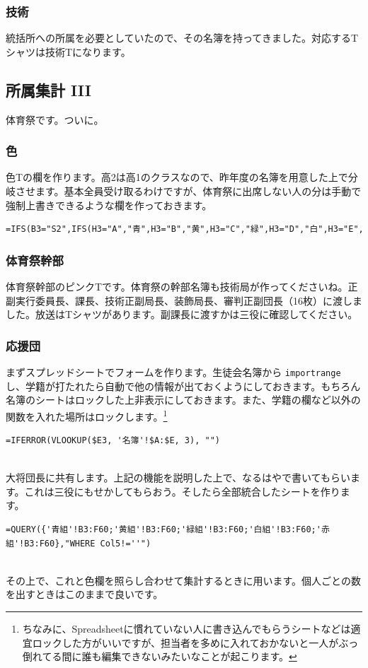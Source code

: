 \documentclass[dvipdfmx,jb5]{jreport}
\begin{document}
\subsubsection{技術}
統括所への所属を必要としていたので、その名簿を持ってきました。対応するTシャツは技術Tになります。

\subsection{所属集計 III}
体育祭です。ついに。

\subsubsection{色}
色Tの欄を作ります。高2は高1のクラスなので、昨年度の名簿を用意した上で分岐させます。基本全員受け取るわけですが、体育祭に出席しない人の分は手動で強制上書きできるような欄を作っておきます。
\\
\begin{lstlisting}
=IFS(B3="S2",IFS(H3="A","青",H3="B","黄",H3="C","緑",H3="D","白",H3="E","赤"),B3<>"S2",I3)
\end{lstlisting}

\subsubsection{体育祭幹部}
体育祭幹部のピンクTです。体育祭の幹部名簿も技術局が作ってくださいね。正副実行委員長、課長、技術正副局長、装飾局長、審判正副団長（16枚）に渡しました。放送はTシャツがあります。副課長に渡すかは三役に確認してください。

\subsubsection{応援団}
まずスプレッドシートでフォームを作ります。生徒会名簿から \texttt{importrange} し、学籍が打たれたら自動で他の情報が出ておくようにしておきます。もちろん名簿のシートはロックした上非表示にしておきます。また、学籍の欄など以外の関数を入れた場所はロックします。\footnote{ちなみに、Spreadsheetに慣れていない人に書き込んでもらうシートなどは適宜ロックした方がいいですが、担当者を多めに入れておかないと一人がぶっ倒れてる間に誰も編集できないみたいなことが起こります。}
\\
\begin{lstlisting}
=IFERROR(VLOOKUP($E3, '名簿'!$A:$E, 3), "")
\end{lstlisting}
\\
大将団長に共有します。上記の機能を説明した上で、なるはやで書いてもらいます。これは三役にもせかしてもらおう。そしたら全部統合したシートを作ります。
\\
\begin{lstlisting}
=QUERY({'青組'!B3:F60;'黄組'!B3:F60;'緑組'!B3:F60;'白組'!B3:F60;'赤組'!B3:F60},"WHERE Col5!=''")
\end{lstlisting}
\\
その上で、これと色欄を照らし合わせて集計するときに用います。個人ごとの数を出すときはこのままで良いです。
\end{document}
